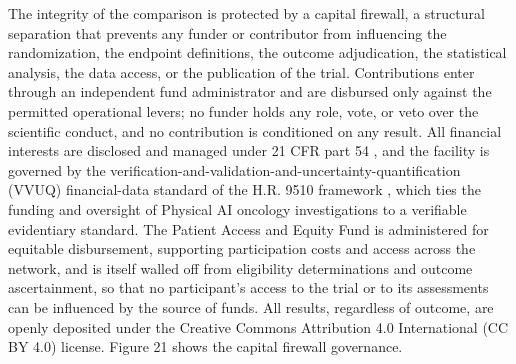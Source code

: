 The integrity of the comparison is protected by a capital firewall, a structural
separation that prevents any funder or contributor from influencing the
randomization, the endpoint definitions, the outcome adjudication, the statistical
analysis, the data access, or the publication of the trial. Contributions enter
through an independent fund administrator and are disbursed only against the
permitted operational levers; no funder holds any role, vote, or veto over the
scientific conduct, and no contribution is conditioned on any result. All financial
interests are disclosed and managed under 21 CFR part 54 \cite{ecfr2026part54}, and
the facility is governed by the verification-and-validation-and-uncertainty-quantification
(VVUQ) financial-data standard of the H.R. 9510 framework \cite{kawchak2026hr9510},
which ties the funding and oversight of Physical AI oncology investigations to a
verifiable evidentiary standard. The Patient Access and Equity Fund is administered
for equitable disbursement, supporting participation costs and access across the
network, and is itself walled off from eligibility determinations and outcome
ascertainment, so that no participant's access to the trial or to its assessments
can be influenced by the source of funds. All results, regardless of outcome, are
openly deposited under the Creative Commons Attribution 4.0 International (CC BY 4.0)
license. Figure 21 shows the capital firewall governance.

